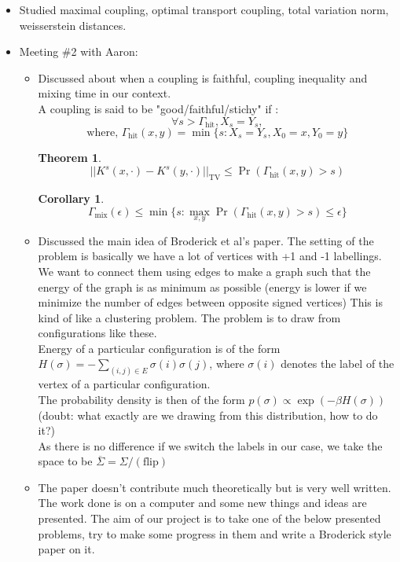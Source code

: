 \documentclass{article}
\newtheorem{theorem}{Theorem}[section]
\newtheorem{corollary}{Corollary}[theorem]
\begin{document}
\begin{itemize}
			\item Studied maximal coupling, optimal transport coupling, total variation norm, weisserstein distances.
			\item Meeting \#2 with Aaron:
				\begin{itemize}
					\item Discussed about when a coupling is faithful, coupling inequality and mixing time in our context.\\
					A coupling is said to be "good/faithful/stichy" if :
					$$\forall s>\Gamma_{\text{hit}}, X_s = Y_s,$$
					$$\text{where, } \Gamma_{\text{hit}}(x, y) = \min\{s: X_s = Y_s, X_0 = x, Y_0 = y\}$$
					\begin{theorem}
						$$||K^s(x, \cdot) - K^s(y, \cdot)||_{\text{TV}} \leq \Pr(\Gamma_{\text{hit}}(x, y) > s)$$
					\end{theorem}
					\begin{corollary}
						$$\Gamma_{\text{mix}}(\epsilon) \leq \min\{s : \max_{x, y} \Pr(\Gamma_{\text{hit}}(x, y) > s) \leq \epsilon\}$$
					\end{corollary}
					\item Discussed the main idea of Broderick et al's paper. The setting of the problem is basically we have a lot of vertices with +1 and -1 labellings.
					We want to connect them using edges to make a graph such that the energy of the graph is as minimum as possible (energy is lower if we minimize the number of edges between opposite signed vertices)
					This is kind of like a clustering problem. The problem is to draw from configurations like these.\\
					Energy of a particular configuration is of the form $H(\sigma) = -\sum_{(i, j) \in E} \sigma(i)\sigma(j)$, where $\sigma(i)$ denotes the label of the vertex of a particular configuration.\\
					The probability density is then of the form $p(\sigma) \propto \exp(-\beta H(\sigma))$ (doubt: what exactly are we drawing from this distribution, how to do it?)\\
					As there is no difference if we switch the labels in our case, we take the space to be $\overline{\Sigma} = \Sigma/(\text{flip})$
					\item The paper doesn't contribute much theoretically but is very well written. The work done is on a computer and some new things and ideas are presented. The aim of our project is to take one of the below presented problems, try to make some progress in them and write a Broderick style paper on it.

\end{itemize}
\end{itemize}
\end{document}
